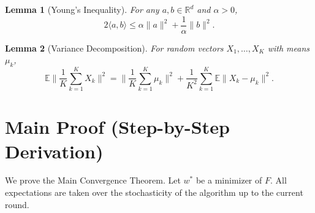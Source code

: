\documentclass{article}
\newtheorem{lemma}{Lemma}
\begin{document}
\begin{lemma}[Young's Inequality]
For any $a,b \in \mathbb{R}^d$ and $\alpha > 0$,
\begin{equation}
2\langle a, b \rangle \le \alpha \|a\|^2 + \frac{1}{\alpha}\|b\|^2.
\end{equation}
\end{lemma}

\begin{lemma}[Variance Decomposition]
For random vectors $X_1,\dots,X_K$ with means $\mu_k$,
\begin{equation}
\mathbb{E}\Big\|\frac{1}{K}\sum_{k=1}^K X_k\Big\|^2 = \Big\|\frac{1}{K}\sum_{k=1}^K \mu_k\Big\|^2 + \frac{1}{K^2}\sum_{k=1}^K \mathbb{E}\|X_k - \mu_k\|^2.
\end{equation}
\end{lemma}

\section*{Main Proof (Step-by-Step Derivation)}
We prove the Main Convergence Theorem. Let $w^*$ be a minimizer of $F$. All expectations are taken over the stochasticity of the algorithm up to the current round.
\end{document}
